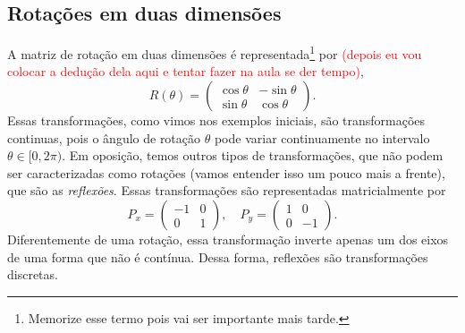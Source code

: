 \documentclass{article}
\numberwithin{equation}{section}
\numberwithin{figure}{section}
\begin{document}
\subsection{Rotações em duas dimensões}
A matriz de rotação em duas dimensões é representada\footnote{Memorize esse termo pois vai ser importante mais tarde.} por \textcolor{red}{(depois eu vou colocar a dedução dela aqui e tentar fazer na aula se der tempo)},
\begin{equation}\label{rotação 2d}
	R(\theta)=\begin{pmatrix}
		\cos\theta & -\sin\theta \\
		\sin\theta & \cos\theta 
	\end{pmatrix}.
\end{equation}
Essas transformações, como vimos nos exemplos iniciais, são transformações continuas, pois o ângulo de rotação $\theta$ pode variar continuamente no intervalo $\theta\in[0,2\pi)$. Em oposição, temos outros tipos de transformações, que não podem ser caracterizadas como rotações (vamos entender isso um pouco mais a frente), que são as \textit{reflexões}. Essas transformações são representadas matricialmente por
\begin{equation}
	P_x = \begin{pmatrix}
		-1 & 0 \\
		0 & 1
	\end{pmatrix},\quad 
	P_y= \begin{pmatrix}
		1 & 0 \\
		0 & -1
	\end{pmatrix}.
\end{equation}
Diferentemente de uma rotação, essa transformação inverte apenas um dos eixos de uma forma que não é contínua. Dessa forma, reflexões são transformações discretas. 
\end{document}

